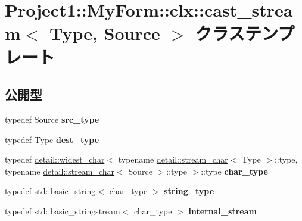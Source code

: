 \hypertarget{class_project1_1_1_my_form_1_1clx_1_1cast__stream}{}\section{Project1\+:\+:My\+Form\+:\+:clx\+:\+:cast\+\_\+stream$<$ Type, Source $>$ クラステンプレート}
\label{class_project1_1_1_my_form_1_1clx_1_1cast__stream}
\subsection*{公開型}
\begin{DoxyCompactItemize}
\item 
\mbox{\label{class_project1_1_1_my_form_1_1clx_1_1cast__stream_af0a537f7df0557254490387977c545ba}} 
typedef Source {\bfseries src\+\_\+type}
\item 
\mbox{\label{class_project1_1_1_my_form_1_1clx_1_1cast__stream_af58084766d001872f4b3f64ee7c0c300}} 
typedef Type {\bfseries dest\+\_\+type}
\item 
\mbox{\label{class_project1_1_1_my_form_1_1clx_1_1cast__stream_a0bbc71a4347cbdc9cd20b2428ba4e236}} 
typedef \hyperlink{struct_project1_1_1_my_form_1_1clx_1_1detail_1_1widest__char}{detail\+::widest\+\_\+char}$<$ typename \hyperlink{struct_project1_1_1_my_form_1_1clx_1_1detail_1_1stream__char}{detail\+::stream\+\_\+char}$<$ Type $>$\+::type, typename \hyperlink{struct_project1_1_1_my_form_1_1clx_1_1detail_1_1stream__char}{detail\+::stream\+\_\+char}$<$ Source $>$\+::type $>$\+::type {\bfseries char\+\_\+type}
\item 
\mbox{\label{class_project1_1_1_my_form_1_1clx_1_1cast__stream_aac4589e719ad0437cfc7951ed6939057}} 
typedef std\+::basic\+\_\+string$<$ char\+\_\+type $>$ {\bfseries string\+\_\+type}
\item 
\mbox{\label{class_project1_1_1_my_form_1_1clx_1_1cast__stream_a6dccdd3ed78cd25dbd6dfef270ab9cf7}} 
typedef std\+::basic\+\_\+stringstream$<$ char\+\_\+type $>$ {\bfseries internal\+\_\+stream}
\end{DoxyCompactItemize}
